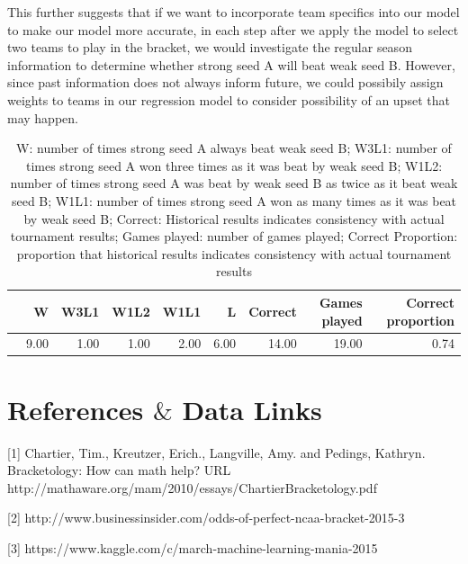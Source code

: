 \documentclass{article} %
\begin{document}
This further suggests that if we want to incorporate team specifics into our model to make our model more accurate, in each step after we apply the model to select two teams to play in the bracket, we would investigate the regular season information to determine whether strong seed A will beat weak seed B. However, since past information does not always inform future, we could possibily assign weights to teams in our regression model to consider possibility of an upset that may happen. 


\begin{table}[ht]
\centering
\begin{tabular}{rrrrrrrrr}
\hline
& W & W3L1 & W1L2 & W1L1 & L & Correct & Games played & Correct proportion \\ 
\hline
& 9.00 & 1.00 & 1.00 & 2.00 & 6.00 & 14.00 & 19.00 & 0.74 \\ 
\hline
\end{tabular}

\caption{W: number of times strong seed A always beat weak seed B; W3L1: number of times strong seed A won three times as it was beat by weak seed B; W1L2: number of times strong seed A was beat by weak seed B as twice as it beat weak seed B; W1L1: number of times strong seed A won as many times as it was beat by weak seed B; Correct: Historical results indicates consistency with actual tournament results; Games played: number of games played; Correct Proportion: proportion that historical results indicates consistency with actual tournament results}
\end{table}





\section{References $\&$ Data Links}
[1] Chartier, Tim., Kreutzer, Erich., Langville,  Amy. and Pedings, Kathryn. Bracketology: How can math help? URL http://mathaware.org/mam/2010/essays/ChartierBracketology.pdf

[2] http://www.businessinsider.com/odds-of-perfect-ncaa-bracket-2015-3

[3] https://www.kaggle.com/c/march-machine-learning-mania-2015
\end{document}
